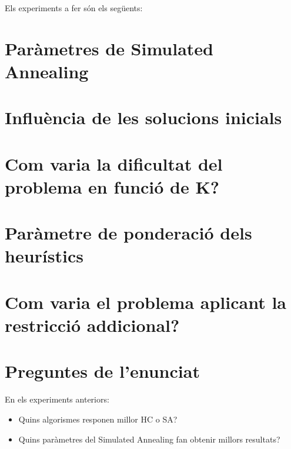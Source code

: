 
Els experiments a fer són els següents:

\section{Paràmetres de Simulated Annealing} %
\label{sec:expSA}


\section{Influència de les solucions inicials} %
\label{sec:expsolini}

	
\newpage
\section{Com varia la dificultat del problema en funció de K?} %
\label{sec:expk}



\newpage %
\section{Paràmetre de ponderació dels heurístics} %
\label{sec:expkh}




\section{Com varia el problema aplicant la restricció addicional?} %
\label{sec:restadd}





\section{Preguntes de l'enunciat} %
\label{sec:preguntes}

En els experiments anteriors:
\begin{itemize}
\item Quins algorismes responen millor HC o SA?
\item Quins paràmetres del Simulated Annealing fan obtenir millors resultats?
\end{itemize}

